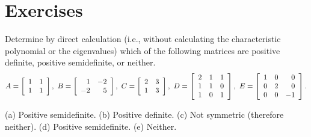 \documentclass{ximera}
\author{Zack Reed}
\begin{document}
\section*{Exercises}

\begin{exercise}
  Determine by direct calculation (i.e., without calculating the
  characteristic polynomial or the eigenvalues) which of the following
  matrices are positive definite, positive semidefinite, or neither.
  \begin{equation*}
    A = \startmat{rr}
      1 & 1 \\
      1 & 1 \\
    \stopmat,\quad
    B = \startmat{rr}
      1  & -2 \\
      -2 &  5 \\
    \stopmat,\quad
    C = \startmat{rr}
      2 & 3 \\
      1 & 3 \\
    \stopmat,\quad
    D = \startmat{rrr}
      2 & 1 & 1 \\
      1 & 1 & 0 \\
      1 & 0 & 1 \\
    \stopmat,\quad
    E = \startmat{rrr}
      1 & 0 &  0 \\
      0 & 2 &  0 \\
      0 & 0 & -1 \\
    \stopmat.
  \end{equation*}
  \begin{solution}
    (a) Positive semidefinite. (b) Positive definite. (c) Not
    symmetric (therefore neither). (d) Positive semidefinite. (e)
    Neither.
  \end{solution}
\end{exercise}
\end{document}
